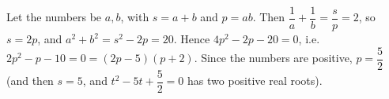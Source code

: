 Let the numbers be $a,b$, with $s=a+b$ and $p=ab$. Then $\dfrac{1}{a}+\dfrac{1}{b}=\dfrac {s}{p}=2$, so $s=2p$, and $a^2+b^2=s^2-2p=20$. Hence $4p^2-2p-20=0$, i.e. $2p^2-p-10=0=(2p-5)(p+2)$. Since the numbers are positive, $p=\boxed{\dfrac{5}{2}}$ (and then $s=5$, and $t^2-5t+\dfrac{5}{2}=0$ has two positive real roots).
